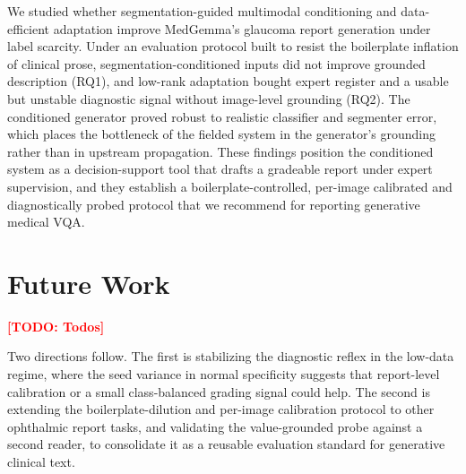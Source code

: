 \documentclass[runningheads]{llncs}
\newcommand{\todo}[1]{\textcolor{red}{\textbf{[TODO: #1]}}}
\begin{document}
We studied whether segmentation-guided multimodal conditioning and data-efficient
adaptation improve MedGemma's glaucoma report generation under label scarcity. Under an
evaluation protocol built to resist the boilerplate inflation of clinical prose,
segmentation-conditioned inputs did not improve grounded description (RQ1), and low-rank
adaptation bought expert register and a usable but unstable diagnostic signal without
image-level grounding (RQ2). The conditioned generator proved robust to realistic classifier
and segmenter error, which places the bottleneck of the fielded system in the generator's
grounding rather than in upstream propagation. These findings position the conditioned
system as a decision-support tool that drafts a gradeable report under expert supervision,
and they establish a boilerplate-controlled, per-image calibrated and diagnostically probed
protocol that we recommend for reporting generative medical VQA.


\section{Future Work}
\todo{Todos}

Two directions follow. The first is stabilizing the diagnostic
reflex in the low-data regime, where the seed variance in normal specificity suggests that
report-level calibration or a small class-balanced grading signal could help. The second is
extending the boilerplate-dilution and per-image calibration protocol to other ophthalmic
report tasks, and validating the value-grounded probe against a second reader, to
consolidate it as a reusable evaluation standard for generative clinical text.

\end{document}

